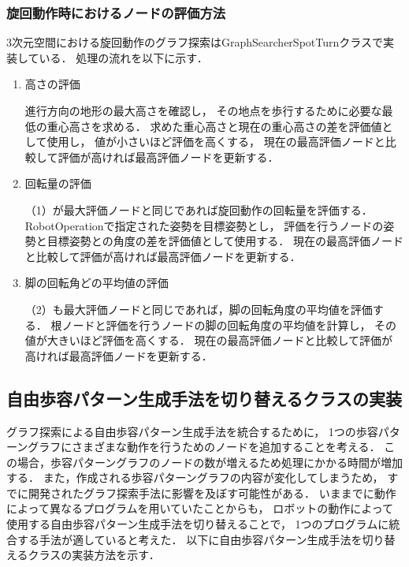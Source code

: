 \subsubsection{旋回動作時におけるノードの評価方法}
3次元空間における旋回動作のグラフ探索はGraphSearcherSpotTurnクラスで実装している．
処理の流れを以下に示す．

\begin{enumerate}
  \item 高さの評価\par
    進行方向の地形の最大高さを確認し，
    その地点を歩行するために必要な最低の重心高さを求める．
    求めた重心高さと現在の重心高さの差を評価値として使用し，
    値が小さいほど評価を高くする，
    現在の最高評価ノードと比較して評価が高ければ最高評価ノードを更新する．
  \item 回転量の評価\par
    （1）が最大評価ノードと同じであれば旋回動作の回転量を評価する．
    RobotOperationで指定された姿勢を目標姿勢とし，
    評価を行うノードの姿勢と目標姿勢との角度の差を評価値として使用する．
    現在の最高評価ノードと比較して評価が高ければ最高評価ノードを更新する．
  \item 脚の回転角どの平均値の評価\par
    （2）も最大評価ノードと同じであれば，脚の回転角度の平均値を評価する．
    根ノードと評価を行うノードの脚の回転角度の平均値を計算し，
    その値が大きいほど評価を高くする．
    現在の最高評価ノードと比較して評価が高ければ最高評価ノードを更新する．
\end{enumerate}

\subsection{自由歩容パターン生成手法を切り替えるクラスの実装}
グラフ探索による自由歩容パターン生成手法を統合するために，
1つの歩容パターングラフにさまざまな動作を行うためのノードを追加することを考える．
この場合，歩容パターングラフのノードの数が増えるため処理にかかる時間が増加する．
また，作成される歩容パターングラフの内容が変化してしまうため，
すでに開発されたグラフ探索手法に影響を及ぼす可能性がある．
いままでに動作によって異なるプログラムを用いていたことからも，
ロボットの動作によって使用する自由歩容パターン生成手法を切り替えることで，
1つのプログラムに統合する手法が適していると考えた．
以下に自由歩容パターン生成手法を切り替えるクラスの実装方法を示す．


